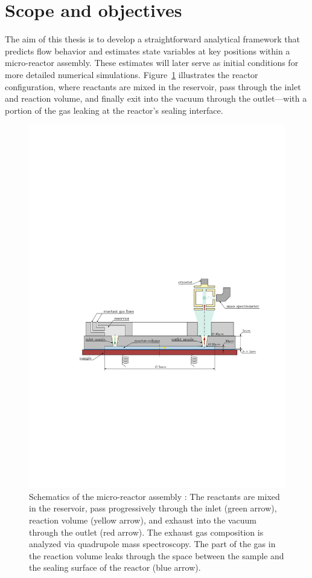 \section{Scope and objectives}\label{sec:scope-objectives}
	The aim of this thesis is to develop a straightforward analytical framework that predicts flow behavior and estimates state variables at key positions within a micro-reactor assembly.
	These estimates will later serve as initial conditions for more detailed numerical simulations.
	Figure \ref{fig:technical-drawing} illustrates the reactor configuration, where reactants are mixed in the reservoir, pass through the inlet and reaction volume, and finally exit into the vacuum through the outlet—with a portion of the gas leaking at the reactor’s sealing interface.
	\begin{figure}[H]
	    \centering
	    \includegraphics[width=\textwidth]{src/01_scope-and-objectives/fig_technical-drawing.pdf}
	    \caption{Schematics of the micro-reactor assembly \cite{lagin2025poster}: The reactants are mixed in the reservoir, pass progressively through the inlet (green arrow), reaction volume (yellow arrow), and exhaust into the vacuum through the outlet (red arrow). The exhaust gas composition is analyzed via quadrupole mass spectroscopy. The part of the gas in the reaction volume leaks through the space between the sample and the sealing surface of the reactor (blue arrow).}
	    \label{fig:technical-drawing}
	\end{figure}
